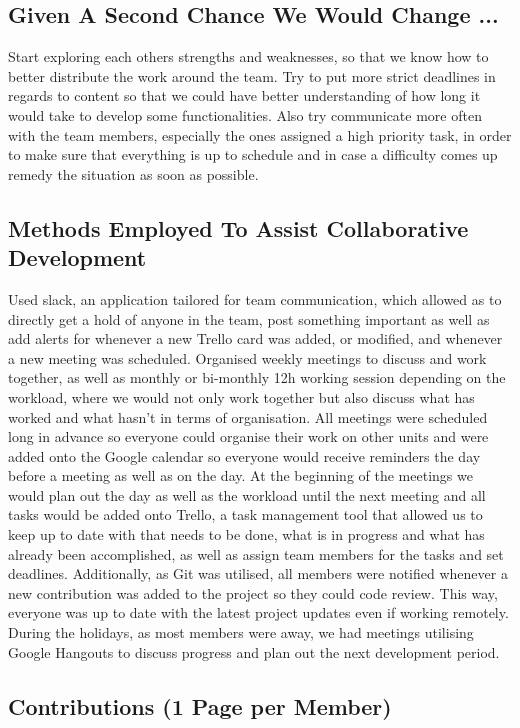 \documentclass[11pt,a4paper]{article}
\begin{document}
        \subsection{Given A Second Chance We Would Change ...}
        Start exploring each others strengths and weaknesses, so that we know how to better distribute the work around the team. Try to put more strict deadlines in regards to content so that we could have better understanding of how long it would take to develop some functionalities. 
        Also try communicate more often with the team members, especially the ones assigned a high priority task, in order to make sure that everything is up to schedule and in case a difficulty comes up remedy the situation as soon as possible.

        \subsection{Methods Employed To Assist Collaborative Development}
        Used slack, an application tailored for team communication, which allowed as to directly get a hold of anyone in the team, post something important as well as add alerts for whenever a new Trello card was added, or modified, and whenever a new meeting was scheduled. 
        Organised weekly meetings to discuss and work together, as well as monthly or bi-monthly 12h working session depending on the workload, where we would not only work together but also discuss what has worked and what hasn’t in terms of organisation. All meetings were scheduled long in advance so everyone could organise their work on other units and were added onto the Google calendar so everyone would receive reminders the day before a meeting as well as on the day.
        At the beginning of the meetings we would plan out the day as well as the workload until the next meeting and all tasks would be added onto Trello, a task management tool that allowed us to keep up to date with that needs to be done, what is in progress and what has already been accomplished, as well as assign team members for the tasks and set deadlines.
        Additionally, as Git was utilised, all members were notified whenever a new contribution was added to the project so they could code review. This way, everyone was up to date with the latest project updates even if working remotely. 
        During the holidays, as most members were away, we had meetings utilising Google Hangouts to discuss progress and plan out the next development period. 


        \subsection{Contributions (1 Page per Member)}
\end{document}
